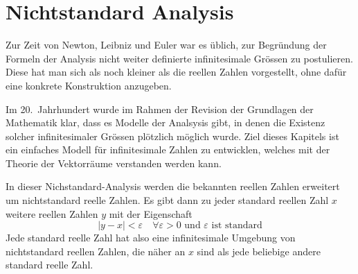 %
%
%
\chapter{Nichtstandard Analysis}
Zur Zeit von Newton, Leibniz und Euler war es üblich, zur Begründung der
Formeln der Analysis nicht weiter definierte infinitesimale Grössen
zu postulieren.
Diese hat man sich als noch kleiner als die reellen Zahlen vorgestellt,
ohne dafür eine konkrete Konstruktion anzugeben.

Im 20.~Jahrhundert wurde im Rahmen der Revision der Grundlagen der Mathematik
klar, dass es Modelle der Analsysis gibt, in denen die Existenz solcher
infinitesimaler Grössen plötzlich möglich wurde.
Ziel dieses Kapitels ist ein einfaches Modell für infinitesimale 
Zahlen zu entwicklen, welches mit der Theorie der Vektorräume
verstanden werden kann.

In dieser Nichstandard-Analysis werden die bekannten reellen Zahlen
erweitert um nichtstandard reelle Zahlen.
Es gibt dann zu jeder standard reellen Zahl $x$ weitere reellen Zahlen $y$ 
mit der Eigenschaft
\[
|y - x| < \varepsilon\quad\forall \varepsilon > 0 \text{ und $\varepsilon$ ist standard}
\]
Jede standard reelle Zahl hat also eine infinitesimale Umgebung von 
nichtstandard reellen Zahlen, die näher an $x$ sind als jede beliebige
andere standard reelle Zahl.







